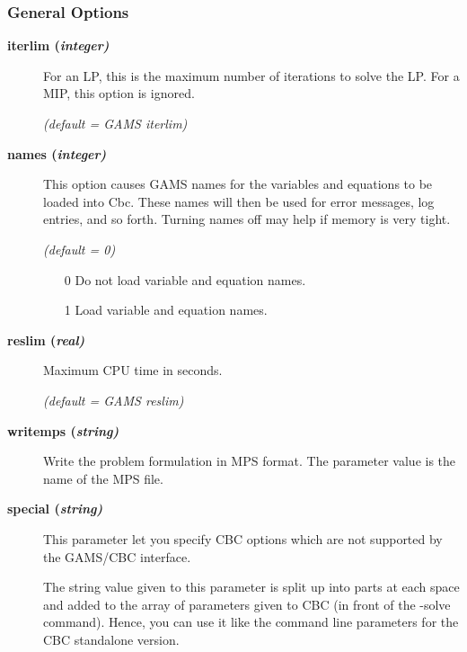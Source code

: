 \subsubsection{General Options}

\begin{description}

\item[\label{iterlim}\hypertarget{iterlim}
{\textbf{iterlim (\slshape{integer})}}]\hspace{1.0in}

For an LP, this is the maximum number of iterations to solve the LP.
For a MIP, this option is ignored.

\textsl{(default = GAMS iterlim)}

\item[\label{names}\hypertarget{names}
{\textbf{names (\slshape{integer})}}]\hspace{1.0in}

This option causes GAMS names for the variables and equations to be loaded into Cbc.
These names will then be used for error messages, log entries, and so forth.
Turning names off may help if memory is very tight.

\textsl{(default = 0)}
\begin{itemize}
\item[0] Do not load variable and equation names.
\item[1] Load variable and equation names.
\end{itemize}

\item[\label{reslim}\hypertarget{reslim}
{\textbf{reslim (\slshape{real})}}]\hspace{1.0in}

Maximum CPU time in seconds.

\textsl{(default = GAMS reslim)}

\item[\label{writemps}\hypertarget{writemps}
{\textbf{writemps (\slshape{string})}}]\hspace{1.0in}

Write the problem formulation in MPS format.
The parameter value is the name of the MPS file.

\item[\label{special}\hypertarget{special}
{\textbf{special (\slshape{string})}}]\hspace{1.0in}

This parameter let you specify CBC options which are not supported by the GAMS/CBC interface.

The string value given to this parameter is split up into parts at each space and added to the array of parameters given to CBC (in front of the -solve command).
Hence, you can use it like the command line parameters for the CBC standalone version.

\end{description}

